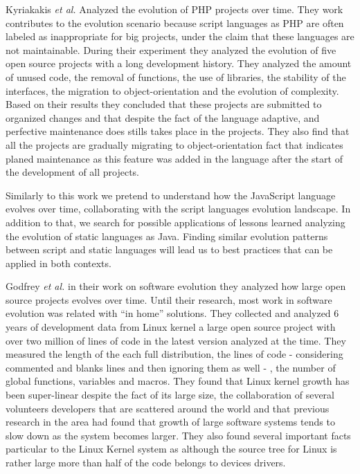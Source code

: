 Kyriakakis \emph{et al.} \cite{Kyriakakis2014ICMSE} Analyzed the evolution of PHP projects over time. They work contributes to the evolution scenario because script languages as PHP are often labeled as inappropriate for big projects, under the claim that these languages are not maintainable. During their experiment they analyzed the evolution of five open source projects with a long development history. They analyzed the amount of unused code, the removal of functions, the use of libraries, the stability of the interfaces, the migration to object-orientation and the evolution of complexity. Based on their results they concluded that these projects are submitted to organized changes and that despite the fact of the language adaptive, and perfective maintenance does stills takes place in the projects. They also find that all the projects are gradually migrating to object-orientation fact that indicates planed maintenance as this feature was added in the language after the start of the development of all projects. 

Similarly to this work we pretend to understand how the JavaScript language evolves over time, collaborating with the script languages evolution landscape. In addition to that, we search for possible applications of lessons learned analyzing the evolution of static languages as Java. Finding similar evolution patterns between script and static languages will lead us to best practices that can be applied in both contexts. 

Godfrey \emph{et al.} \cite{Godfrey2000ICMS} in their work on software evolution they analyzed how large open source projects evolves over time. Until their research, most work in software evolution was related with ``in home'' solutions. They collected and analyzed 6 years of development data from Linux kernel a large open source project with over two million of lines of code in the latest version analyzed at the time. They measured the length of the each full distribution, the lines of code - considering commented and blanks lines and then ignoring them as well - , the number of global functions, variables and macros. They found that Linux kernel growth has been super-linear despite the fact of its large size, the collaboration of several volunteers developers that are scattered around the world and that previous research in the area had found that growth of large software systems tends to slow down as the system becomes larger. They also found several important facts particular to the Linux Kernel system as although the source tree for Linux is rather large more than half of the code belongs to devices drivers. 

